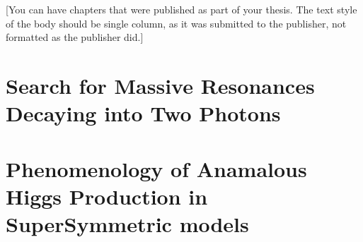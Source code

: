 \documentclass[14pt]{caltech_thesis}
\begin{document}
[You can have chapters that were published as part of your thesis. The
text style of the body should be single column, as it was submitted to
the publisher, not formatted as the publisher did.]

\printbibliography[heading=bibintoc]

 
\appendix

\chapter{Search for Massive Resonances Decaying into Two Photons}

\chapter{Phenomenology of Anamalous Higgs Production in SuperSymmetric models}\label{hggPheno}






\printindex

\theendnotes

\end{document}
